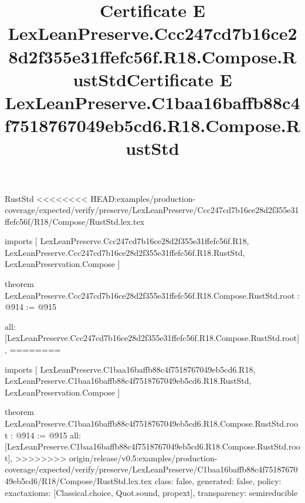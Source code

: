 \begin{lexlean}{RustStd}
<<<<<<<< HEAD:examples/production-coverage/expected/verify/preserve/LexLeanPreserve/Ccc247cd7b16ce28d2f355e31ffefc56f/R18/Compose/RustStd.lex.tex
\title{Certificate E LexLeanPreserve.Ccc247cd7b16ce28d2f355e31ffefc56f.R18.Compose.RustStd}
\begin{coremodule}
imports [
  LexLeanPreserve.Ccc247cd7b16ce28d2f355e31ffefc56f.R18,
  LexLeanPreserve.Ccc247cd7b16ce28d2f355e31ffefc56f.R18.RustStd,
  LexLeanPreservation.Compose
]

theorem LexLeanPreserve.Ccc247cd7b16ce28d2f355e31ffefc56f.R18.Compose.RustStd.root : @914 := @915 {
  all: [LexLeanPreserve.Ccc247cd7b16ce28d2f355e31ffefc56f.R18.Compose.RustStd.root],
========
\title{Certificate E LexLeanPreserve.C1baa16baffb88c4f7518767049eb5cd6.R18.Compose.RustStd}
\begin{coremodule}
imports [
  LexLeanPreserve.C1baa16baffb88c4f7518767049eb5cd6.R18,
  LexLeanPreserve.C1baa16baffb88c4f7518767049eb5cd6.R18.RustStd,
  LexLeanPreservation.Compose
]

theorem LexLeanPreserve.C1baa16baffb88c4f7518767049eb5cd6.R18.Compose.RustStd.root : @914 := @915 {
  all: [LexLeanPreserve.C1baa16baffb88c4f7518767049eb5cd6.R18.Compose.RustStd.root],
>>>>>>>> origin/release/v0.5:examples/production-coverage/expected/verify/preserve/LexLeanPreserve/C1baa16baffb88c4f7518767049eb5cd6/R18/Compose/RustStd.lex.tex
  class: false,
  generated: false,
  policy: exact{axioms: [Classical.choice, Quot.sound, propext]},
  transparency: semireducible
}


\end{coremodule}}
\end{coremodule}
\end{lexlean}
